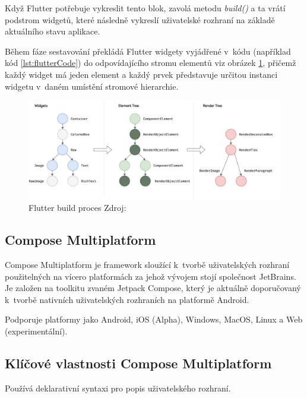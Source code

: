 Když Flutter potřebuje vykreslit tento blok, zavolá metodu \emph{build()} a ta vrátí podstrom widgetů, které následně vykreslí uživatelské 
rozhraní na základě aktuálního stavu aplikace. \cite*{flutterArchOverview}

Během fáze sestavování překládá Flutter widgety vyjádřené v~kódu (například kód \ref{lst:flutterCode}) do odpovídajícího stromu elementů viz obrázek \ref{fig:flutter_trees}, přičemž každý widget má jeden element a 
každý prvek představuje určitou instanci widgetu v~daném umístění stromové hierarchie. \cite*{flutterArchOverview}


\begin{figure}[H]
  \centering
  \includegraphics[width=1\textwidth]{flutter_trees.png}
  \caption{Flutter build proces Zdroj: \cite{flutterArchOverview}}
  \label{fig:flutter_trees}
\end{figure}


\subsection{Compose Multiplatform}

Compose Multiplatform je framework sloužící k~tvorbě uživatelských rozhraní použitelných na vícero platformách za 
jehož vývojem stojí společnost JetBrains. \cite{composeMultiplatform} Je založen na toolkitu zvaném Jetpack Compose, který je aktuálně 
doporučovaný k~tvorbě nativních uživatelských rozhraních na platformě Android. \cite{jetpack}

Podporuje platformy jako Android, iOS (Alpha), Windows, MacOS, Linux a Web (experimentální). \cite{composeMultiplatform}

\medskip

\subsection*{Klíčové vlastnosti Compose Multiplatform}

Používá deklarativní syntaxi pro popis uživatelského rozhraní. \cite{KMPUseCases}

